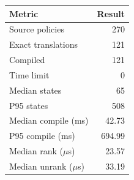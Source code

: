\begin{tabular}{lr}
\toprule
Metric & Result \\
\midrule
Source policies & 270 \\
Exact translations & 121 \\
Compiled & 121 \\
Time limit & 0 \\
Median states & 65 \\
P95 states & 508 \\
Median compile (ms) & 42.73 \\
P95 compile (ms) & 694.99 \\
Median rank ($\mu$s) & 23.57 \\
Median unrank ($\mu$s) & 33.19 \\
\bottomrule
\end{tabular}
